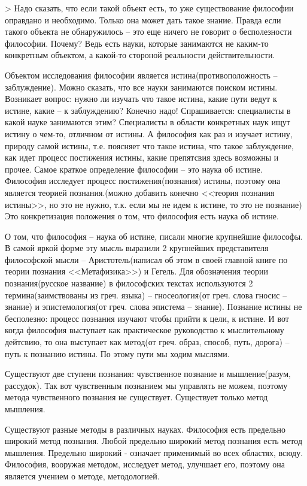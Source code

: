 > Надо сказать, что если такой объект есть, то уже существование философии оправдано и необходимо. Только она может дать такое знание. Правда если такого объекта не обнаружилось – это еще ничего не говорит о бесполезности философии. Почему? Ведь есть науки, которые занимаются не каким-то конкретным объектом, а какой-то стороной реальности действительности.

Объектом исследования философии является истина(противоположность – заблуждение). Можно сказать, что все науки занимаются поиском истины. Возникает вопрос: нужно ли изучать что такое истина, какие пути ведут к истине, какие – к заблуждению? Конечно надо! Спрашивается: специалисты в какой науке занимаются этим? Специалисты в области конкретных наук ищут истину о чем-то, отличном от истины. А философия как раз и изучает истину, природу самой истины, т.е. поясняет что такое истина, что такое заблуждение, как идет процесс постижения истины, какие препятсвия здесь возможны и прочее. Самое краткое определение философии – это наука об истине. Философия исследует процесс постижения(познания) истины, поэтому она является теорией познания.(можно добавить конечно <<теория познания истины>>, но это не нужно, т.к. если мы не идем к истине, то это не познание) Это конкретизация положения о том, что философия есть наука об истине.

О том, что философия – наука об истине, писали многие крупнейшие философы. В самой яркой форме эту мысль выразили 2 крупнейших представителя философской мысли – Аристотель(написал об этом в своей главной книге по теории познания <<Метафизика>>) и Гегель. Для обозначения теории познания(русское название) в философских текстах используются 2 термина(заимствованы из греч. языка) – гносеология(от греч. слова гносис – знание) и эпистемология(от греч. слова эпистема – знание). Познание истины не бесполезно: процесс познания изучают чтобы прийти к цели, к истине. И вот когда философия выступает как практическое руководство к мыслительному дейтсвию, то она выступает как метод(от греч. образ, способ, путь, дорога) – путь к познанию истины. По этому пути мы ходим мыслями.

Существуют две ступени познания: чувственное познание и мышление(разум, рассудок). Так вот чувственным познанием мы управлять не можем, поэтому метода чувственного познания не существует. Существует только метод мышления.

Существуют разные методы в различных науках. Философия есть предельно широкий метод познания. Любой предельно широкий метод познания есть метод мышления. Предельно широкий - означает применимый во всех областях, всюду. Философия, вооружая методом, исследует метод, улучшает его, поэтому она является учением о методе, методологией.

